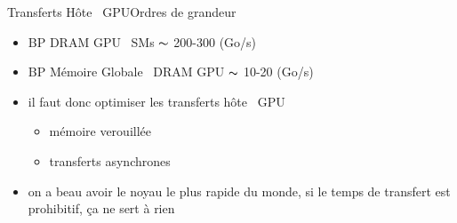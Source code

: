 \documentclass[11pt,mathserif]{beamer}
\newcommand{\scout}{\faAngellist}
\newcommand{\argi}{\faLightbulbO}
\newcommand{\kontuz}{\faExclamationTriangle}
\newcommand{\harritu}{\faExclamation}
\newcommand{\geziBikoitz}{\faArrowsH}
\begin{document}
\begin{frame}{Transferts Hôte \geziBikoitz\  GPU}{Ordres de grandeur}
  \begin{itemize}[<+->]
    \item[\argi] BP DRAM GPU \geziBikoitz\ SMs $\thicksim$ 200-300 (Go/s)
    \item[\argi] BP Mémoire Globale \geziBikoitz\ DRAM GPU $\thicksim$ 10-20 (Go/s)
    \item[\scout] il faut donc optimiser les transferts hôte \geziBikoitz\ GPU
      \begin{itemize}
        \item mémoire verouillée
        \item transferts asynchrones
      \end{itemize}
    \item[\kontuz] on a beau avoir le noyau le plus rapide du monde, si le temps de transfert est prohibitif, ça ne sert à rien \harritu
  \end{itemize}
\end{frame}
\end{document}
